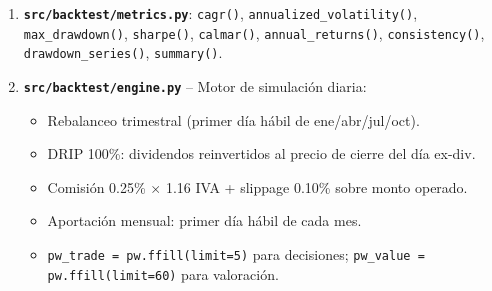 \documentclass[12pt, a4paper]{article}
\begin{document}
\begin{enumerate}

  \item \textbf{\texttt{src/backtest/metrics.py}}: \texttt{cagr()}, \texttt{annualized\_volatility()},
    \texttt{max\_drawdown()}, \texttt{sharpe()}, \texttt{calmar()}, \texttt{annual\_returns()},
    \texttt{consistency()}, \texttt{drawdown\_series()}, \texttt{summary()}.

  \item \textbf{\texttt{src/backtest/engine.py}} -- Motor de simulaci\'{o}n diaria:
    \begin{itemize}
      \item Rebalanceo trimestral (primer d\'{i}a h\'{a}bil de ene/abr/jul/oct).
      \item DRIP 100\%: dividendos reinvertidos al precio de cierre del d\'{i}a ex-div.
      \item Comisi\'{o}n 0.25\% $\times$ 1.16 IVA + slippage 0.10\% sobre monto operado.
      \item Aportaci\'{o}n mensual: primer d\'{i}a h\'{a}bil de cada mes.
      \item \texttt{pw\_trade = pw.ffill(limit=5)} para decisiones; \texttt{pw\_value = pw.ffill(limit=60)} para valoraci\'{o}n.
    \end{itemize}


\end{enumerate}
\end{document}
